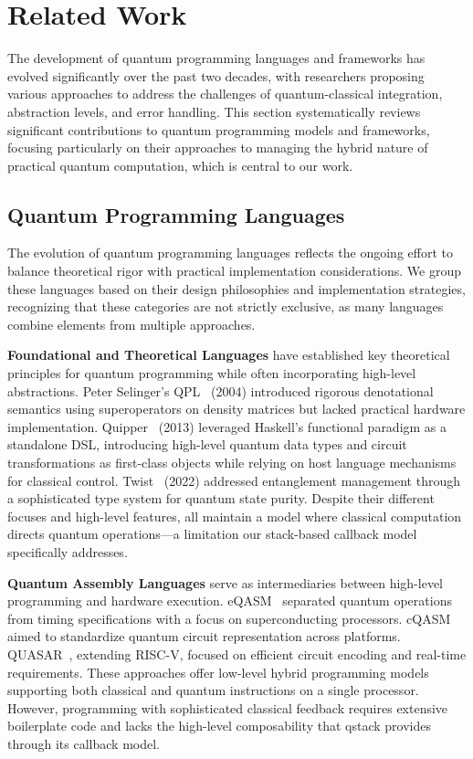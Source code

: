 \section{Related Work}\label{sec:related}

The development of quantum programming languages and frameworks has evolved significantly over the past two decades, with researchers proposing various approaches to address the challenges of quantum-classical integration, abstraction levels, and error handling. This section systematically reviews significant contributions to quantum programming models and frameworks, focusing particularly on their approaches to managing the hybrid nature of practical quantum computation, which is central to our work.

\subsection{Quantum Programming Languages}

The evolution of quantum programming languages reflects the ongoing effort to balance theoretical rigor with practical implementation considerations. We group these languages based on their design philosophies and implementation strategies, recognizing that these categories are not strictly exclusive, as many languages combine elements from multiple approaches.

\textbf{Foundational and Theoretical Languages} have established key theoretical principles for quantum programming while often incorporating high-level abstractions. Peter Selinger's QPL~\cite{selinger2004towards} (2004) introduced rigorous denotational semantics using superoperators on density matrices but lacked practical hardware implementation. Quipper~\cite{green2013quipper} (2013) leveraged Haskell's functional paradigm as a standalone DSL, introducing high-level quantum data types and circuit transformations as first-class objects while relying on host language mechanisms for classical control. Twist~\cite{yuan2022twist} (2022) addressed entanglement management through a sophisticated type system for quantum state purity. Despite their different focuses and high-level features, all maintain a model where classical computation directs quantum operations—a limitation our stack-based callback model specifically addresses.

\textbf{Quantum Assembly Languages} serve as intermediaries between high-level programming and hardware execution. eQASM~\cite{fu2019eqasm} separated quantum operations from timing specifications with a focus on superconducting processors. cQASM~\cite{khammassi2018cqasm} aimed to standardize quantum circuit representation across platforms. QUASAR~\cite{butko2020understanding}, extending RISC-V, focused on efficient circuit encoding and real-time requirements. These approaches offer low-level hybrid programming models supporting both classical and quantum instructions on a single processor. However, programming with sophisticated classical feedback requires extensive boilerplate code and lacks the high-level composability that qstack provides through its callback model.

